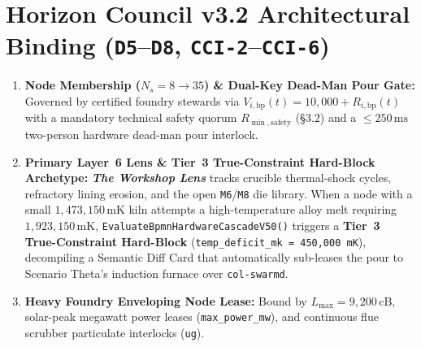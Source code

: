 \section{Horizon Council v3.2 Architectural Binding (\texttt{D5}--\texttt{D8}, \texttt{CCI-2}--\texttt{CCI-6})}
\begin{enumerate}
    \item \textbf{Node Membership ($N_s = 8 \to 35$) \& Dual-Key Dead-Man Pour Gate:} Governed by certified foundry stewards via $V_{i,\mathrm{bp}}(t) = 10{,}000 + R_{i,\mathrm{bp}}(t)$ with a mandatory technical safety quorum $R_{\min,\mathrm{safety}}$ (\S 3.2) and a $\le 250\,\mathrm{ms}$ two-person hardware dead-man pour interlock.
    \item \textbf{Primary Layer~6 Lens \& Tier~3 True-Constraint Hard-Block Archetype:} \textbf{\textit{The Workshop Lens}} tracks crucible thermal-shock cycles, refractory lining erosion, and the open \texttt{M6}/\texttt{M8} die library. When a node with a small $1{,}473{,}150\,\mathrm{mK}$ kiln attempts a high-temperature alloy melt requiring $1{,}923{,}150\,\mathrm{mK}$, \texttt{EvaluateBpmnHardwareCascadeV50()} triggers a \textbf{Tier~3 True-Constraint Hard-Block} (\texttt{temp\_deficit\_mk = 450,000 mK}), decompiling a Semantic Diff Card that automatically sub-leases the pour to Scenario Theta's induction furnace over \texttt{col-swarmd}.
    \item \textbf{Heavy Foundry Enveloping Node Lease:} Bound by $L_{\max} = 9{,}200\,\mathrm{cB}$, solar-peak megawatt power leases (\texttt{max\_power\_mw}), and continuous flue scrubber particulate interlocks (\texttt{ug}).
\end{enumerate}

